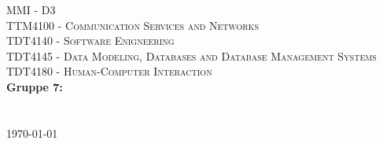 \begin{titlepage}
\begin{center}

\vspace*{3cm}
\textsc{\Huge MMI - D3}\\[0.7cm]
\textsc{\medium TTM4100 - Communication Services and Networks}\\[0.3cm]
\textsc{\medium TDT4140 - Software Enigneering}\\[0.3cm]
\textsc{\medium TDT4145 - Data Modeling, Databases and Database Management Systems}\\[0.3cm]
\textsc{\medium TDT4180 - Human-Computer Interaction}\\[0.3cm]

\textbf{\Large Gruppe 7:} \\[0.2cm]
 \\
\\[1cm]

\today

\end{center}
\end{titlepage}